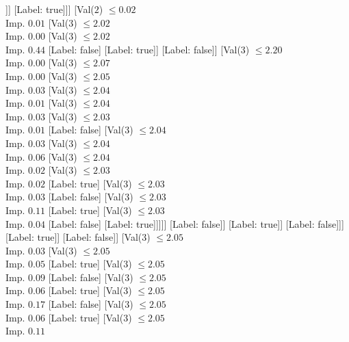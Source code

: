 \documentclass[margin=10pt]{standalone}
\begin{document}
\begin{forest}
									]]
							[Label: true]]]
					[Val($2$) $ \leq 0.02$ \\ Imp. $0.01$
						[Val($3$) $ \leq 2.02$ \\ Imp. $0.00$
							[Val($3$) $ \leq 2.02$ \\ Imp. $0.44$
								[Label: false]
								[Label: true]]
							[Label: false]]
						[Val($3$) $ \leq 2.20$ \\ Imp. $0.00$
							[Val($3$) $ \leq 2.07$ \\ Imp. $0.00$
								[Val($3$) $ \leq 2.05$ \\ Imp. $0.03$
									[Val($3$) $ \leq 2.04$ \\ Imp. $0.01$
										[Val($3$) $ \leq 2.04$ \\ Imp. $0.03$
											[Val($3$) $ \leq 2.03$ \\ Imp. $0.01$
												[Label: false]
												[Val($3$) $ \leq 2.04$ \\ Imp. $0.03$
													[Val($3$) $ \leq 2.04$ \\ Imp. $0.06$
														[Val($3$) $ \leq 2.04$ \\ Imp. $0.02$
															[Val($3$) $ \leq 2.03$ \\ Imp. $0.02$
																[Label: true]
																[Val($3$) $ \leq 2.03$ \\ Imp. $0.03$
																	[Label: false]
																	[Val($3$) $ \leq 2.03$ \\ Imp. $0.11$
																		[Label: true]
																		[Val($3$) $ \leq 2.03$ \\ Imp. $0.04$
																			[Label: false]
																			[Label: true]]]]]
															[Label: false]]
														[Label: true]]
													[Label: false]]]
											[Label: true]]
										[Label: false]]
									[Val($3$) $ \leq 2.05$ \\ Imp. $0.03$
										[Val($3$) $ \leq 2.05$ \\ Imp. $0.05$
											[Label: true]
											[Val($3$) $ \leq 2.05$ \\ Imp. $0.09$
												[Label: false]
												[Val($3$) $ \leq 2.05$ \\ Imp. $0.06$
													[Label: true]
													[Val($3$) $ \leq 2.05$ \\ Imp. $0.17$
														[Label: false]
														[Val($3$) $ \leq 2.05$ \\ Imp. $0.06$
															[Label: true]
															[Val($3$) $ \leq 2.05$ \\ Imp. $0.11$

\end{forest}
\end{document}
